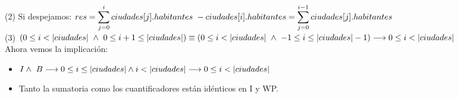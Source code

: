 \documentclass[10pt,a4paper,fleqn]{article}
\begin{document}
(2) Si despejamos: $res = \small \displaystyle \sum_{j=0}^{i} ciudades[j].habitantes \ - ciudades[i].habitantes = \small \displaystyle \sum_{j=0}^{i-1} ciudades[j].habitantes$\\
(3) $(0 \leq i < |ciudades| \ \land \ 0 \leq i+1 \leq |ciudades|)\equiv(0 \leq i < |ciudades| \ \land \ -1 \leq i \leq |ciudades|-1)\\
\implica 0 \leq i <|ciudades|$\\
Ahora vemos la implicación: \\
\begin{itemize}
    \item \parbox[t]{\textwidth}{$I \land \ B \longrightarrow 0 \leq i \leq |ciudades| \land i < |ciudades| \longrightarrow 0 \leq i < |ciudades|$}
    \item \parbox[t]{\textwidth}{Tanto la sumatoria como los cuantificadores están idénticos en I y WP.}
\end{itemize}
\end{document}
